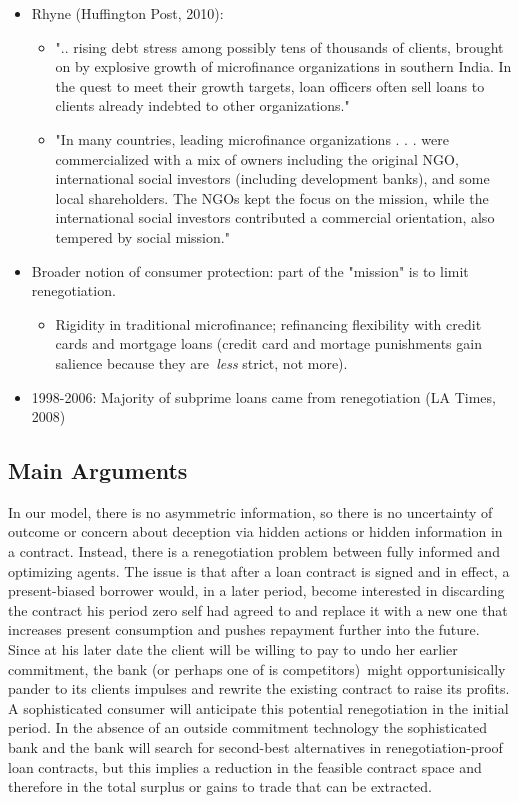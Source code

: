\documentclass[11pt]{article}%
\begin{document}
\begin{itemize}
\item Rhyne (Huffington Post, 2010):

\begin{itemize}
\item ".. rising debt stress among possibly tens of thousands of clients,
brought on by explosive growth of microfinance organizations in southern
India. In the quest to meet their growth targets, loan officers often sell
loans to clients already indebted to other organizations."

\item "In many countries, leading microfinance organizations . . . were
commercialized with a mix of owners including the original NGO, international
social investors (including development banks), and some local shareholders.
The NGOs kept the focus on the mission, while the international social
investors contributed a commercial orientation, also tempered by social mission."
\end{itemize}

\item Broader notion of consumer protection: part of the "mission" is to limit renegotiation.

\begin{itemize}
\item Rigidity in traditional microfinance; refinancing flexibility with
credit cards and mortgage loans (credit card and mortage punishments gain
salience because they are\textit{\ less} strict, not more).
\end{itemize}

\item 1998-2006: Majority of subprime loans came from renegotiation (LA Times, 2008)
\end{itemize}

\subsection{Main Arguments}

In our model, there is no asymmetric information, so there is no uncertainty
of outcome or concern about deception via hidden actions or hidden information
in a contract. Instead, there is a renegotiation problem between fully
informed and optimizing agents. The issue is that after a loan contract is
signed and in effect, a present-biased borrower would, in a later period,
become interested in discarding the contract his period zero self had agreed
to and replace it with a new one that increases present consumption and pushes
repayment further into the future. Since at his later date the client will be
willing to pay to undo her earlier commitment, the bank (or perhaps one of is
competitors)\ might opportunisically pander to its clients impulses and
rewrite the existing contract to raise its profits. A sophisticated
consumer will anticipate this potential renegotiation in the initial period. In the
absence of an outside commitment technology the sophisticated bank and the
bank will search for second-best alternatives in renegotiation-proof loan
contracts, but this implies a reduction in the feasible contract space and
therefore in the total surplus or gains to trade that can be extracted. \ 
\end{document}
